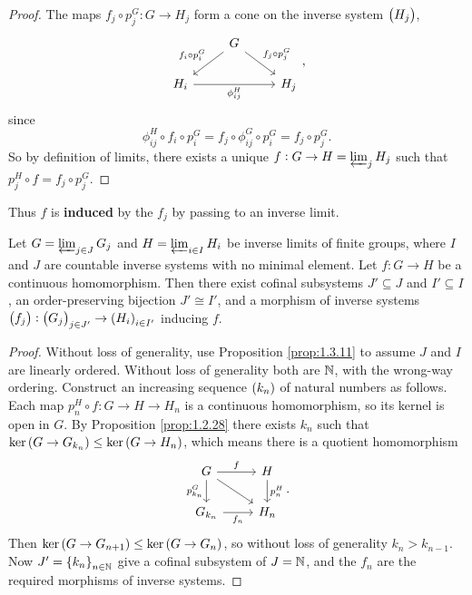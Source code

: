 \begin{proof}
The maps $ f_j \circ p_j^G : G \to H_j $ form a cone on the inverse system $ \br{H_j} $,
$$
\begin{tikzcd}
& G \arrow{dl}[swap]{f_i \circ p_i^G} \arrow{dr}{f_j \circ p_j^G} & \\
H_i \arrow{rr}[swap]{\phi_{ij}^H} & & H_j
\end{tikzcd},
$$
since
$$ \phi_{ij}^H \circ f_i \circ p_i^G = f_j \circ \phi_{ij}^G \circ p_i^G = f_j \circ p_j^G. $$
So by definition of limits, there exists a unique $ f : G \to H = \varprojlim_j H_j $ such that $ p_j^H \circ f = f_j \circ p_j^G $.
\end{proof}

Thus $ f $ is \textbf{induced} by the $ f_j $ by passing to an inverse limit.

\begin{proposition}
\label{prop:2.4.11}
Let $ G = \varprojlim_{j \in J} G_j $ and $ H = \varprojlim_{i \in I} H_i $ be inverse limits of finite groups, where $ I $ and $ J $ are countable inverse systems with no minimal element. Let $ f : G \to H $ be a continuous homomorphism. Then there exist cofinal subsystems $ J' \subseteq J $ and $ I' \subseteq I $, an order-preserving bijection $ J' \cong I' $, and a morphism of inverse systems $ \br{f_j} : \br{G_j}_{j \in J'} \to \br{H_i}_{i \in I'} $ inducing $ f $.
\end{proposition}

\begin{proof}
Without loss of generality, use Proposition \ref{prop:1.3.11} to assume $ J $ and $ I $ are linearly ordered. Without loss of generality both are $ \mathbb{N} $, with the wrong-way ordering. Construct an increasing sequence $ \br{k_n} $ of natural numbers as follows. Each map $ p_n^H \circ f : G \to H \to H_n $ is a continuous homomorphism, so its kernel is open in $ G $. By Proposition \ref{prop:1.2.28} there exists $ k_n $ such that $ \ker \br{G \to G_{k_n}} \le \ker \br{G \to H_n} $, which means there is a quotient homomorphism
$$
\begin{tikzcd}
G \arrow{r}{f} \arrow{d}[swap]{p_{k_n}^G} \arrow{dr} & H \arrow{d}{p_n^H} \\
G_{k_n} \arrow{r}[swap]{f_n} & H_n
\end{tikzcd}.
$$
Then $ \ker \br{G \to G_{n + 1}} \le \ker \br{G \to G_n} $, so without loss of generality $ k_n > k_{n - 1} $. Now $ J' = \cbr{k_n}_{n \in \NN} $ give a cofinal subsystem of $ J = \mathbb{N} $, and the $ f_n $ are the required morphisms of inverse systems.
\end{proof}

